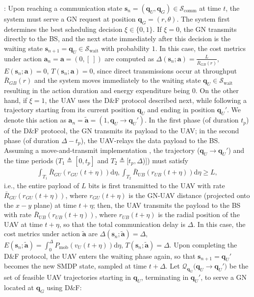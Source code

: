 \documentclass[10pt,twocolumn]{IEEEtran}
\begin{document}
:
Upon reaching a communication state $\mathbf{s}_{n}{=}(\mathbf{q}_{U},\mathbf{q}_{G}){\in}\mathcal{S}_{\mathrm{comm}}$ at time $t$, the system must serve a GN request at position $\mathbf{q}_{G}{=}(r,\theta)$. The system first determines the best scheduling decision $\xi{\in}\{0,1\}$. If $\xi{=}0$, the GN transmits directly to the BS, and the next state immediately after this decision is the waiting state $\mathbf{s}_{n{+}1}{=}\mathbf{q}_{U}{\in}\mathcal{S}_{\mathrm{wait}}$ with probability $1$. In this case, the cost metrics under action $\mathbf{a}_{n}{=}\mathbf{a}{=}(0,[\ ])$ are computed as $\Delta(\mathbf{s}_{n};\mathbf{a}){=}\frac{L}{\bar R_{GB}(r)}$, $E(\mathbf{s}_{n};\mathbf{a}){=}0$, $T(\mathbf{s}_{n};\mathbf{a}){=}0$, since direct transmissions occur at throughput $\bar{R}_{GB}(r)$ and the system moves immediately to the waiting state $\mathbf{q}_{U}{\in}\mathcal{S}_{\mathrm{wait}}$ resulting in the action duration and energy expenditure being $0$. On the other hand, if $\xi{=}1$, the UAV uses the D\&F protocol described next, while following a trajectory starting from its current position $\mathbf{q}_{U}$ and ending in position $\mathbf{q}_{U}'$. We denote this action as $\mathbf{a}_{n}{=}\mathbf{\tilde{a}}{=}(1,\mathbf{q}_{U}{\rightarrow}{\mathbf{q}}_{U}')$. In the first phase (of duration $t_{p}$) of the D\&F protocol, the GN transmits its payload to the UAV; in the second phase (of duration $\Delta{-}t_{p}$), the UAV-relays the data payload to the BS. Assuming a move-and-transmit implementation \cite{SCA}, the trajectory ($\mathbf{q}_{U}{\rightarrow}{\mathbf{q}}_{U}'$) and the time periods ($T_{1}{\triangleq}[0{,}t_{p}]$ and $T_{2}{\triangleq}[t_{p}{,}\Delta$)]) must satisfy
\begin{align}
	\int_{T_{1}}\bar{R}_{GU}(r_{GU}(t{+}\eta))\mathrm{d}{\eta},\int_{T_{2}}\bar{R}_{UB}(r_{UB}(t{+}\eta))\mathrm{d}{\eta}{\geq}L\label{eq:PLConst1}\tag{C.1},
\end{align}
i.e., the entire payload of $L$ bits is first transmitted to the UAV with rate $\bar{R}_{GU}(r_{GU}(t{+}\eta))$, where $r_{GU}(t{+}{\eta})$ is the GN-UAV distance (projected onto the $x{-}y$ plane) at time $t{+}\eta$; then, the UAV transmits the payload to the BS with rate $\bar{R}_{UB}(r_{UB}(t{+}\eta))$, where $r_{UB}(t{+}\eta)$ is the radial position of the UAV at time $t{+}\eta$, so that the total communication delay is $\Delta$.  In this case, the cost metrics under action $\mathbf{\tilde{a}}$ are $\Delta(\mathbf{s}_{n};\mathbf{\tilde{a}}){=}\Delta$, $E(\mathbf{s}_{n};\mathbf{\tilde{a}}){=}\int_0^\Delta P_{\mathrm{mob}}\left(v_{U}(t{+}\eta)\right)\mathrm{d}\eta$, $T(\mathbf{s}_{n};\mathbf{\tilde{a}}){=}\Delta$. Upon completing the D\&F protocol, the UAV enters the waiting phase again, so that $\mathbf{s}_{n{+}1}{=}\mathbf{q}_{U}'$ becomes the new SMDP state, sampled at time $t{+}\Delta$. Let $\mathcal{Q}_{\mathbf{q}_{G}}\big(\mathbf{q}_{U}{\rightarrow}{\mathbf{q}}_{U}'\big)$ be the set of feasible UAV trajectories starting in $\mathbf{q}_{U}$, terminating in $\mathbf{q}_{U}'$, to serve a GN located at $\mathbf{q}_{G}$ using D\&F:
\end{document}
